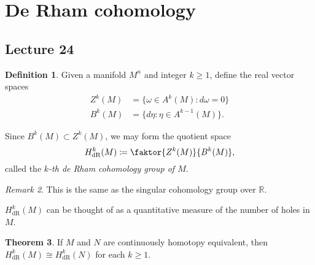 \documentclass[10pt,letterpaper,cm]{nupset}
\theoremstyle{definition}
\newtheorem{definition}{Definition}[subsection]
\theoremstyle{theorem}
\newtheorem{theorem}[definition]{Theorem}
\theoremstyle{remark}
\newtheorem{remark}[definition]{Remark}
\newcommand{\R}{\mathbb R}
\newcommand{\1}{\mathbf{1}}
\newcommand{\0}{\vec 0}
\DeclareMathOperator{\dr}{dR}
\begin{document}
\section{De Rham cohomology}

\subsection{Lecture 24}

\begin{definition}
Given a manifold $M^n$ and integer $k\geq 1$, define the real vector spaces
\begin{align*}
  Z^k(M) &  = \{\omega \in A^k(M) : d\omega =0\}
 \\  B^k(M) & = \{ d\eta : \eta \in A^{k-1}(M)\}.
 \end{align*}
\end{definition}

 Since $B^k(M) \subset Z^k(M)$, we may form the quotient space $$ H_{\dr}^k(M) \coloneqq  \faktor{Z^k(M)}{B^k(M)},$$ called the \textit{$k$-th de Rham cohomology group of $M$}.

\begin{remark}
This is the same as the singular cohomology group over $\R$.
\end{remark}

$H_{\dr}^k(M)$ can be thought of as a quantitative measure of the number of holes in $M$.

\begin{theorem}
If $M$ and $N$ are continuously homotopy equivalent, then $H_{\dr}^k(M) \cong H_{\dr}^k(N)$ for each $k\geq 1$.
\end{theorem}
\end{document}
